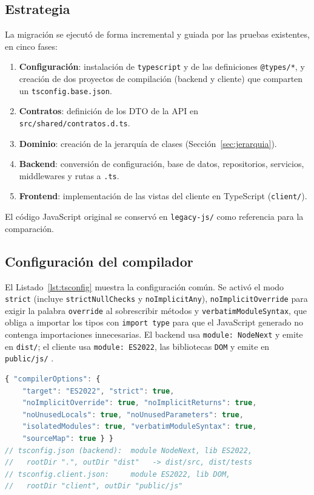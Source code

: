 \documentclass[conference,a4paper]{IEEEtran}
\begin{document}
\subsection{Estrategia}
La migración se ejecutó de forma incremental y guiada por las pruebas existentes, en cinco fases:
\begin{enumerate}
\item \textbf{Configuración}: instalación de \texttt{typescript} y de las definiciones \texttt{@types/*}, y creación de dos proyectos de compilación (backend y cliente) que comparten un \texttt{tsconfig.base.json}.
\item \textbf{Contratos}: definición de los DTO de la API en \texttt{src/shared/contratos.d.ts}.
\item \textbf{Dominio}: creación de la jerarquía de clases (Sección~\ref{sec:jerarquia}).
\item \textbf{Backend}: conversión de configuración, base de datos, repositorios, servicios, middlewares y rutas a \texttt{.ts}.
\item \textbf{Frontend}: implementación de las vistas del cliente en TypeScript (\texttt{client/}).
\end{enumerate}
El código JavaScript original se conservó en \texttt{legacy-js/} como referencia para la comparación.

\subsection{Configuración del compilador}
El Listado~\ref{lst:tsconfig} muestra la configuración común. Se activó el modo \texttt{strict} (incluye \texttt{strictNullChecks} y \texttt{noImplicitAny}), \texttt{noImplicitOverride} para exigir la palabra \texttt{override} al sobrescribir métodos y \texttt{verbatimModuleSyntax}, que obliga a importar los tipos con \texttt{import type} para que el JavaScript generado no contenga importaciones innecesarias. El backend usa \texttt{module: NodeNext} y emite en \texttt{dist/}; el cliente usa \texttt{module: ES2022}, las bibliotecas \texttt{DOM} y emite en \texttt{public/js/} \cite{tsconfig}.

\begin{lstlisting}[language=TypeScript, caption={tsconfig.base.json (opciones comunes) y diferencias por proyecto}, label={lst:tsconfig}]
{ "compilerOptions": {
    "target": "ES2022", "strict": true,
    "noImplicitOverride": true, "noImplicitReturns": true,
    "noUnusedLocals": true, "noUnusedParameters": true,
    "isolatedModules": true, "verbatimModuleSyntax": true,
    "sourceMap": true } }
// tsconfig.json (backend):  module NodeNext, lib ES2022,
//   rootDir ".", outDir "dist"   -> dist/src, dist/tests
// tsconfig.client.json:     module ES2022, lib DOM,
//   rootDir "client", outDir "public/js"
\end{lstlisting}
\end{document}
